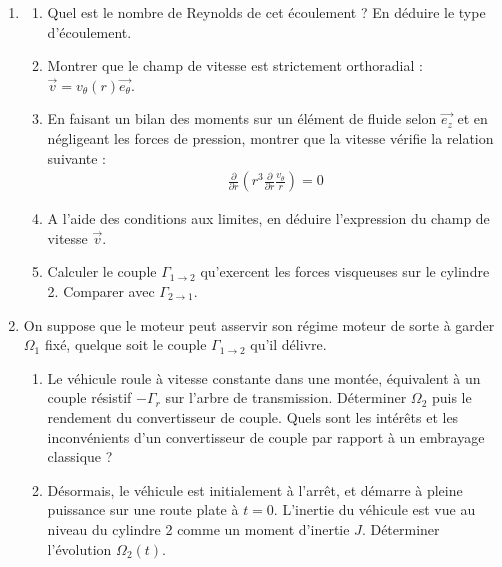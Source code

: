\begin{enumerate}

\item

\begin{enumerate}
		
	\item Quel est le nombre de Reynolds de cet écoulement ? En déduire le type d'écoulement. 
	
	\item Montrer que le champ de vitesse est strictement orthoradial : $\vec{v}=v_\theta (r)\vec{e_\theta}$.
	
	\item En faisant un bilan des moments sur un élément de fluide selon $\vec{e_z}$ et en négligeant les forces de pression, montrer que la vitesse vérifie la relation suivante : 
	\begin{align*}
		\frac{\partial}{\partial r}\left(r^3 \frac{\partial}{\partial r}\frac{v_\theta}{r} \right) =0
	\end{align*}
	
	\item A l'aide des conditions aux limites, en déduire l'expression du champ de vitesse $\vec{v}$.
	
	\item Calculer le couple $\Gamma_{1\rightarrow2}$ qu'exercent les forces visqueuses sur le cylindre 2. Comparer avec $\Gamma_{2\rightarrow1}$.
 \end{enumerate}

\item On suppose que le moteur peut asservir son régime moteur de sorte à garder $\Omega_1$ fixé, quelque soit le couple $\Gamma_{1\rightarrow2}$ qu'il délivre.

\begin{enumerate}
	
	\item Le véhicule roule à vitesse constante dans une montée, équivalent à un couple résistif $-\Gamma_r$ sur l'arbre de transmission. Déterminer $\Omega_2$ puis le rendement du convertisseur de couple. Quels sont les intérêts et les inconvénients d'un convertisseur de couple par rapport à un embrayage classique ?
	
	\item  Désormais, le véhicule est initialement à l'arrêt, et démarre à pleine puissance sur une route plate à $t=0$. L'inertie du véhicule est vue au niveau du cylindre 2 comme un moment d'inertie $J$. Déterminer l'évolution $\Omega_2(t)$. 
		
\end{enumerate}

\end{enumerate}



